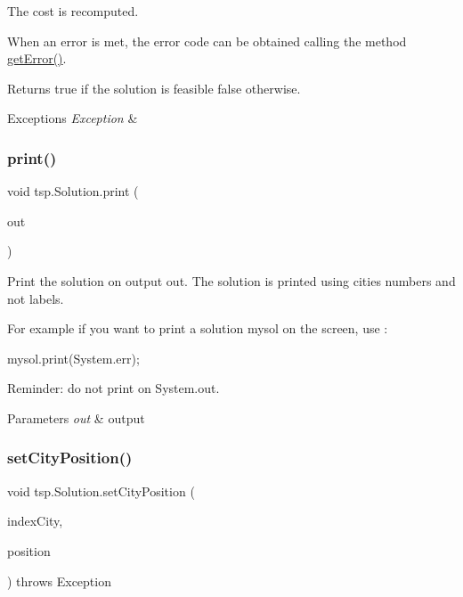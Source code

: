 The cost is recomputed.

When an error is met, the error code can be obtained calling the method \mbox{\hyperlink{classtsp_1_1_solution_acd7f1ed6324f49a3b539905cd15c34bf}{get\+Error()}}.

\begin{DoxyReturn}{Returns}
{\ttfamily true} if the solution is feasible {\ttfamily false} otherwise. 
\end{DoxyReturn}

\begin{DoxyExceptions}{Exceptions}
{\em Exception} & \\
\hline
\end{DoxyExceptions}
\mbox{\label{classtsp_1_1_solution_ad51fdef9006419915ba1485d268bc307}} 
\subsubsection{\texorpdfstring{print()}{print()}}
{\footnotesize\ttfamily void tsp.\+Solution.\+print (\begin{DoxyParamCaption}\item[{Print\+Stream}]{out }\end{DoxyParamCaption})\hspace{0.3cm}{\ttfamily [inline]}}

Print the solution on output {\ttfamily out}. The solution is printed using cities numbers and not labels.

For example if you want to print a solution {\ttfamily mysol} on the screen, use \+:

{\ttfamily mysol.\+print(System.\+err);}

Reminder\+: do not print on System.\+out.


\begin{DoxyParams}{Parameters}
{\em out} & output \\
\hline
\end{DoxyParams}
\mbox{\label{classtsp_1_1_solution_ac412146a40e865c6f0b2b8e44e4ba5e2}} 
\subsubsection{\texorpdfstring{set\+City\+Position()}{setCityPosition()}}
{\footnotesize\ttfamily void tsp.\+Solution.\+set\+City\+Position (\begin{DoxyParamCaption}\item[{int}]{index\+City,  }\item[{int}]{position }\end{DoxyParamCaption}) throws Exception\hspace{0.3cm}{\ttfamily [inline]}}

